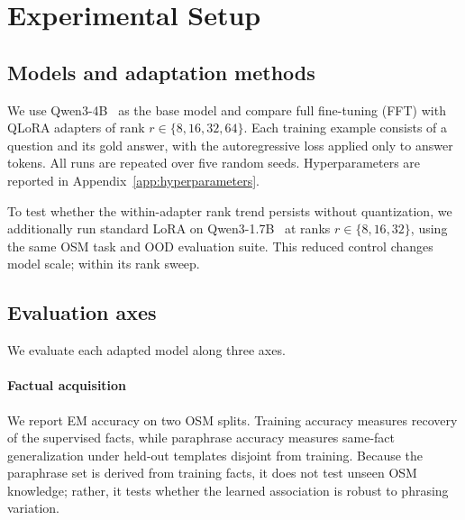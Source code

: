 \documentclass[11pt]{article}
\begin{document}
\section{Experimental Setup}
\label{sec:experimental-setup}

\subsection{Models and adaptation methods}
We use Qwen3-4B~\citep{yang2025qwen3technicalreport} as the base model and
compare full fine-tuning (FFT) with QLoRA adapters of rank
$r \in \{8,16,32,64\}$. Each training example consists of a question and its
gold answer, with the autoregressive loss applied only to answer tokens. All
runs are repeated over five random seeds. Hyperparameters are reported in
Appendix~\ref{app:hyperparameters}.

To test whether the within-adapter rank trend persists without quantization, we
additionally run standard LoRA on Qwen3-1.7B~\citep{yang2025qwen3technicalreport}
at ranks $r\in\{8,16,32\}$, using the same OSM task and OOD evaluation suite.
This reduced control changes model scale; within its rank sweep.


\subsection{Evaluation axes}
We evaluate each adapted model along three axes.

\paragraph{Factual acquisition} 
We report EM accuracy on two OSM splits. Training accuracy measures
recovery of the supervised facts, while paraphrase accuracy measures same-fact
generalization under held-out templates disjoint from training. Because the
paraphrase set is derived from training facts, it does not test unseen OSM
knowledge; rather, it tests whether the learned association
is robust to phrasing variation.

\end{document}
